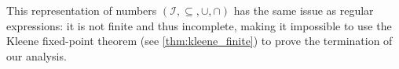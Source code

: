 



%


This representation of numbers $(\mathscr{I}, \subseteq, \cup, \cap)$ has the same issue as regular expressions: it is not finite and thus incomplete, making it impossible to use the Kleene fixed-point theorem (see \autoref{thm:kleene_finite}) to prove the termination of our analysis.

